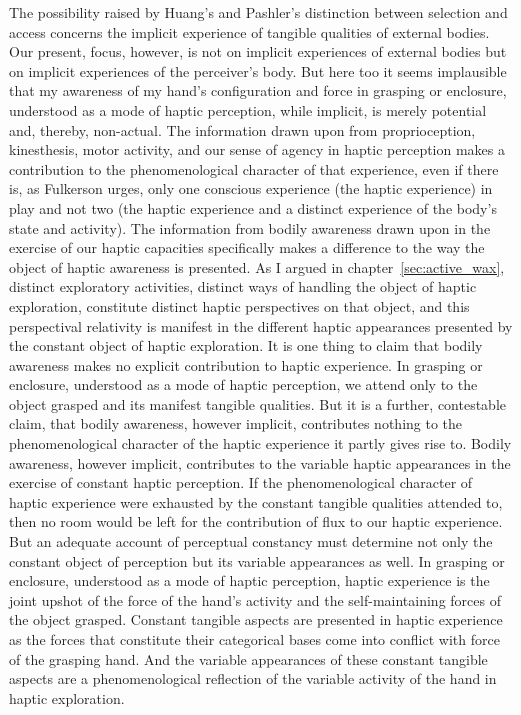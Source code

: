 The possibility raised by Huang's and Pashler's distinction between selection and access concerns the implicit experience of tangible qualities of external bodies. Our present, focus, however, is not on implicit experiences of external bodies but on implicit experiences of the perceiver's body. But here too it seems implausible that my awareness of my hand's configuration and force in grasping or enclosure, understood as a mode of haptic perception, while implicit, is merely potential and, thereby, non-actual. The information drawn upon from proprioception, kinesthesis, motor activity, and our sense of agency in haptic perception makes a contribution to the phenomenological character of that experience, even if there is, as Fulkerson urges, only one conscious experience (the haptic experience) in play and not two (the haptic experience and a distinct experience of the body's state and activity). The information from bodily awareness drawn upon in the exercise of our haptic capacities specifically makes a difference to the way the object of haptic awareness is presented. As I argued in chapter~\ref{sec:active_wax}, distinct exploratory activities, distinct ways of handling the object of haptic exploration, constitute distinct haptic perspectives on that object, and this perspectival relativity is manifest in the different haptic appearances presented by the constant object of haptic exploration. It is one thing to claim that bodily awareness makes no explicit contribution to haptic experience. In grasping or enclosure, understood as a mode of haptic perception, we attend only to the object grasped and its manifest tangible qualities. But it is a further, contestable claim, that bodily awareness, however implicit, contributes nothing to the phenomenological character of the haptic experience it partly gives rise to. Bodily awareness, however implicit, contributes to the variable haptic appearances in the exercise of constant haptic perception. If the phenomenological character of haptic experience were exhausted by the constant tangible qualities attended to, then no room would be left for the contribution of flux to our haptic experience. But an adequate account of perceptual constancy must determine not only the constant object of perception but its variable appearances as well. In grasping or enclosure, understood as a mode of haptic perception, haptic experience is the joint upshot of the force of the hand's activity and the self-maintaining forces of the object grasped. Constant tangible aspects are presented in haptic experience as the forces that constitute their categorical bases come into conflict with force of the grasping hand. And the variable appearances of these constant tangible aspects are a phenomenological reflection of the variable activity of the hand in haptic exploration.

